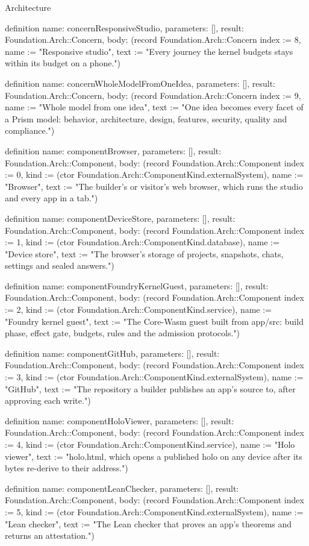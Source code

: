 \begin{lexlean}{Architecture}
\begin{semanticmodule}
definition{
  name: concernResponsiveStudio,
  parameters: [],
  result: Foundation.Arch::Concern,
  body: (record Foundation.Arch::Concern {index := 8, name := "Responsive studio", text := "Every journey the kernel budgets stays within its budget on a phone."})
}

definition{
  name: concernWholeModelFromOneIdea,
  parameters: [],
  result: Foundation.Arch::Concern,
  body: (record Foundation.Arch::Concern {index := 9, name := "Whole model from one idea", text := "One idea becomes every facet of a Prism model: behavior, architecture, design, features, security, quality and compliance."})
}

definition{
  name: componentBrowser,
  parameters: [],
  result: Foundation.Arch::Component,
  body: (record Foundation.Arch::Component {index := 0, kind := (ctor Foundation.Arch::ComponentKind.externalSystem), name := "Browser", text := "The builder's or visitor's web browser, which runs the studio and every app in a tab."})
}

definition{
  name: componentDeviceStore,
  parameters: [],
  result: Foundation.Arch::Component,
  body: (record Foundation.Arch::Component {index := 1, kind := (ctor Foundation.Arch::ComponentKind.database), name := "Device store", text := "The browser's storage of projects, snapshots, chats, settings and sealed answers."})
}

definition{
  name: componentFoundryKernelGuest,
  parameters: [],
  result: Foundation.Arch::Component,
  body: (record Foundation.Arch::Component {index := 2, kind := (ctor Foundation.Arch::ComponentKind.service), name := "Foundry kernel guest", text := "The Core-Wasm guest built from app/src: build phase, effect gate, budgets, rules and the admission protocols."})
}

definition{
  name: componentGitHub,
  parameters: [],
  result: Foundation.Arch::Component,
  body: (record Foundation.Arch::Component {index := 3, kind := (ctor Foundation.Arch::ComponentKind.externalSystem), name := "GitHub", text := "The repository a builder publishes an app's source to, after approving each write."})
}

definition{
  name: componentHoloViewer,
  parameters: [],
  result: Foundation.Arch::Component,
  body: (record Foundation.Arch::Component {index := 4, kind := (ctor Foundation.Arch::ComponentKind.service), name := "Holo viewer", text := "holo.html, which opens a published holo on any device after its bytes re-derive to their address."})
}

definition{
  name: componentLeanChecker,
  parameters: [],
  result: Foundation.Arch::Component,
  body: (record Foundation.Arch::Component {index := 5, kind := (ctor Foundation.Arch::ComponentKind.externalSystem), name := "Lean checker", text := "The Lean checker that proves an app's theorems and returns an attestation."})
}


\end{semanticmodule}
\end{lexlean}
